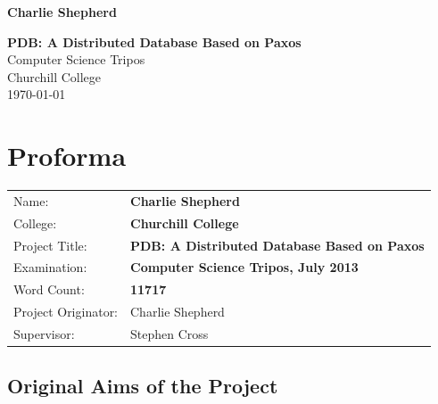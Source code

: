 \documentclass[12pt,twoside,notitlepage]{report}
\begin{document}





\pagestyle{empty}

\hfill{\LARGE \bf Charlie Shepherd}

\vspace*{60mm}
\begin{center}
\Huge
{\bf PDB: A Distributed Database Based on Paxos} \\
\vspace*{5mm}
Computer Science Tripos \\
\vspace*{5mm}
Churchill College \\
\vspace*{5mm}
\today  %
\end{center}

\cleardoublepage


\setcounter{page}{1}
\pagestyle{plain}

\chapter*{Proforma}

{\large
\begin{tabular}{ll}
Name:               & \bf Charlie Shepherd                        \\
College:            & \bf Churchill College                     \\
Project Title:      & \bf PDB: A Distributed Database Based on Paxos \\
Examination:        & \bf Computer Science Tripos, July 2013        \\
Word Count:         & \bf 11717 \\
Project Originator: & Charlie Shepherd                    \\
Supervisor:         & Stephen Cross                    \\
\end{tabular}
}


\section*{Original Aims of the Project}
\end{document}
